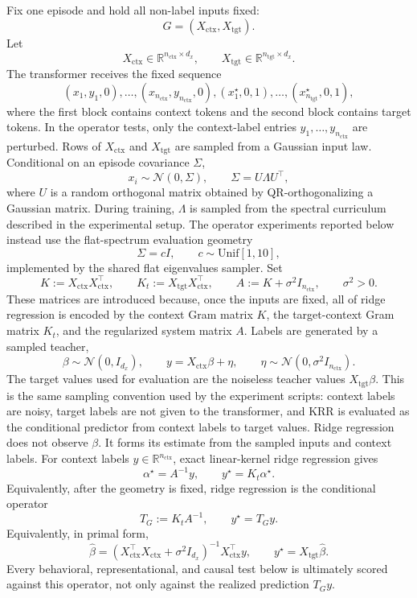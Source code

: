 \documentclass[11pt]{article}
\newcommand{\R}{\mathbb{R}}
\begin{document}
Fix one episode and hold all non-label inputs fixed:
\[
G = (X_{\mathrm{ctx}}, X_{\mathrm{tgt}}).
\]
Let
\[
X_{\mathrm{ctx}} \in \R^{n_{\mathrm{ctx}}\times d_x},
\qquad
X_{\mathrm{tgt}} \in \R^{n_{\mathrm{tgt}}\times d_x}.
\]
The transformer receives the fixed sequence
\[
(x_1,y_1,0),\ldots,(x_{n_{\mathrm{ctx}}},y_{n_{\mathrm{ctx}}},0),
(x^\star_1,0,1),\ldots,(x^\star_{n_{\mathrm{tgt}}},0,1),
\]
where the first block contains context tokens and the second block contains target tokens. In the
operator tests, only the context-label entries \(y_1,\ldots,y_{n_{\mathrm{ctx}}}\) are perturbed. Rows of
\(X_{\mathrm{ctx}}\) and \(X_{\mathrm{tgt}}\) are sampled from a Gaussian input law. Conditional on an
episode covariance \(\Sigma\),
\[
x_i \sim \mathcal{N}(0,\Sigma), \qquad \Sigma = U\Lambda U^\top,
\]
where \(U\) is a random orthogonal matrix obtained by QR-orthogonalizing a Gaussian matrix. During
training, \(\Lambda\) is sampled from the spectral curriculum described in the experimental setup. The
operator experiments reported below instead use the flat-spectrum evaluation geometry
\[
\Sigma = cI,\qquad c\sim \mathrm{Unif}[1,10],
\]
implemented by the shared flat eigenvalues sampler. Set
\[
K := X_{\mathrm{ctx}}X_{\mathrm{ctx}}^\top,\qquad
K_t := X_{\mathrm{tgt}}X_{\mathrm{ctx}}^\top,\qquad
A := K+\sigma^2 I_{n_{\mathrm{ctx}}},\qquad \sigma^2>0.
\]
These matrices are introduced because, once the inputs are fixed, all of ridge regression is encoded
by the context Gram matrix \(K\), the target-context Gram matrix \(K_t\), and the regularized system
matrix \(A\). Labels are generated by a sampled teacher,
\[
\beta\sim \mathcal{N}(0,I_{d_x}),\qquad
y=X_{\mathrm{ctx}}\beta+\eta,\qquad
\eta\sim \mathcal{N}(0,\sigma^2 I_{n_{\mathrm{ctx}}}).
\]
The target values used for evaluation are the noiseless teacher values \(X_{\mathrm{tgt}}\beta\). This is
the same sampling convention used by the experiment scripts: context labels are noisy, target labels
are not given to the transformer, and KRR is evaluated as the conditional predictor from context
labels to target values. Ridge regression does not observe \(\beta\). It forms its estimate from the
sampled inputs and context labels. For context labels \(y\in\R^{n_{\mathrm{ctx}}}\), exact linear-kernel
ridge regression gives
\[
\alpha^\star=A^{-1}y,\qquad y^\star=K_t\alpha^\star.
\]
Equivalently, after the geometry is fixed, ridge regression is the conditional operator
\[
T_G:=K_tA^{-1},\qquad y^\star=T_Gy.
\]
Equivalently, in primal form,
\[
\widehat{\beta} =
\left(X_{\mathrm{ctx}}^\top X_{\mathrm{ctx}}+\sigma^2 I_{d_x}\right)^{-1}
X_{\mathrm{ctx}}^\top y,
\qquad
y^\star=X_{\mathrm{tgt}}\widehat{\beta}.
\]
Every behavioral, representational, and causal test below is ultimately scored against this operator,
not only against the realized prediction \(T_Gy\).
\end{document}
